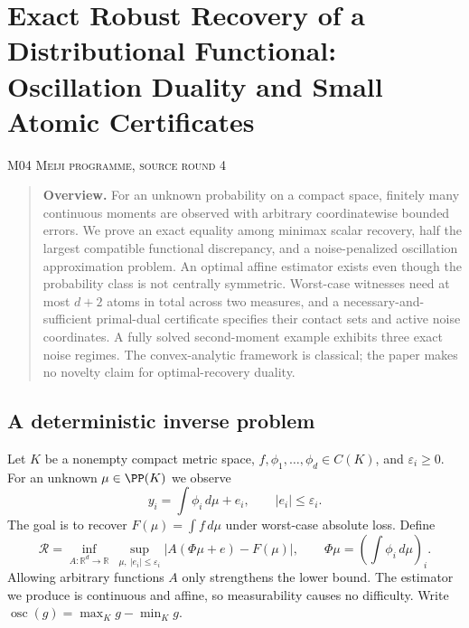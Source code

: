 \documentclass[11pt,a4paper]{article}
\theoremstyle{definition}\newtheorem{definition}[theorem]{Definition}
\theoremstyle{remark}\newtheorem{remark}[theorem]{Remark}
\newcommand{\R}{\mathbb R}\newcommand{\C}{\mathbb C}\newcommand{\N}{\mathbb N}
\numberwithin{equation}{section}
\begin{document}
\clearpage
\section[M04 --- Exact Robust Recovery of a Distributional Functional: Oscillation Duality and Small Atomic Certificates]{Exact Robust Recovery of a Distributional Functional: Oscillation Duality and Small Atomic Certificates}\label{contrib-M04}
\noindent\textsc{M04 \quad Meiji programme, source round 4}\par\medskip


\begin{quote}\small\textbf{Overview.} For an unknown probability on a compact space, finitely many continuous moments are observed with arbitrary coordinatewise bounded errors. We prove an exact equality among minimax scalar recovery, half the largest compatible functional discrepancy, and a noise-penalized oscillation approximation problem. An optimal affine estimator exists even though the probability class is not centrally symmetric. Worst-case witnesses need at most $d+2$ atoms in total across two measures, and a necessary-and-sufficient primal-dual certificate specifies their contact sets and active noise coordinates. A fully solved second-moment example exhibits three exact noise regimes. The convex-analytic framework is classical; the paper makes no novelty claim for optimal-recovery duality.\end{quote}

\subsection{A deterministic inverse problem}\label{M04-sec-1}
Let $K$ be a nonempty compact metric space, $f,\phi_1,\ldots,\phi_d\in C(K)$, and $\varepsilon_i\ge0$. For an unknown $\mu\in\PP(K)$ we observe
\[
 y_i=\int\phi_i\,d\mu+e_i,\qquad |e_i|\le\varepsilon_i.
\]
The goal is to recover $F(\mu)=\int f\,d\mu$ under worst-case absolute loss. Define
\[
 \mathcal R=\inf_{A:\R^d\to\R}\ \sup_{\mu,\ |e_i|\le\varepsilon_i}
 |A(\Phi\mu+e)-F(\mu)|,
 \qquad \Phi\mu=(\textstyle\int\phi_i\,d\mu)_i.
\]
Allowing arbitrary functions $A$ only strengthens the lower bound. The estimator we produce is continuous and affine, so measurability causes no difficulty. Write $\operatorname{osc}(g)=\max_Kg-\min_Kg$.
\end{document}
